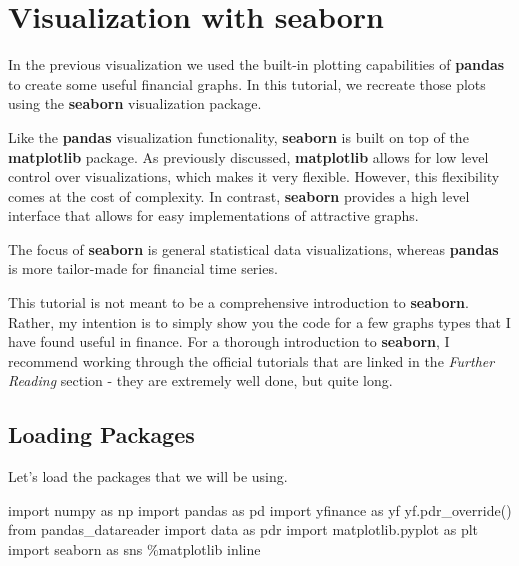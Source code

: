 \documentclass[
  letterpaper,
  DIV=11,
  numbers=noendperiod]{scrreprt}
\newenvironment{Shaded}{\begin{snugshade}}{\end{snugshade}}
\newcommand{\ImportTok}[1]{\textcolor[rgb]{0.00,0.46,0.62}{#1}}
\newcommand{\NormalTok}[1]{\textcolor[rgb]{0.00,0.23,0.31}{#1}}
\newcommand{\OperatorTok}[1]{\textcolor[rgb]{0.37,0.37,0.37}{#1}}
\begin{document}
\hypertarget{visualization-with-seaborn}{%
\chapter{\texorpdfstring{Visualization with
\textbf{seaborn}}{Visualization with seaborn}}\label{visualization-with-seaborn}}

In the previous visualization we used the built-in plotting capabilities
of \textbf{pandas} to create some useful financial graphs. In this
tutorial, we recreate those plots using the \textbf{seaborn}
visualization package.

Like the \textbf{pandas} visualization functionality, \textbf{seaborn}
is built on top of the \textbf{matplotlib} package. As previously
discussed, \textbf{matplotlib} allows for low level control over
visualizations, which makes it very flexible. However, this flexibility
comes at the cost of complexity. In contrast, \textbf{seaborn} provides
a high level interface that allows for easy implementations of
attractive graphs.

The focus of \textbf{seaborn} is general statistical data
visualizations, whereas \textbf{pandas} is more tailor-made for
financial time series.

This tutorial is not meant to be a comprehensive introduction to
\textbf{seaborn}. Rather, my intention is to simply show you the code
for a few graphs types that I have found useful in finance. For a
thorough introduction to \textbf{seaborn}, I recommend working through
the official tutorials that are linked in the \emph{Further Reading}
section - they are extremely well done, but quite long.

\hypertarget{loading-packages-5}{%
\section{Loading Packages}\label{loading-packages-5}}

Let's load the packages that we will be using.

\begin{Shaded}
\begin{Highlighting}[]
\ImportTok{import}\NormalTok{ numpy }\ImportTok{as}\NormalTok{ np}
\ImportTok{import}\NormalTok{ pandas }\ImportTok{as}\NormalTok{ pd}
\ImportTok{import}\NormalTok{ yfinance }\ImportTok{as}\NormalTok{ yf}
\NormalTok{yf.pdr\_override()}
\ImportTok{from}\NormalTok{ pandas\_datareader }\ImportTok{import}\NormalTok{ data }\ImportTok{as}\NormalTok{ pdr}
\ImportTok{import}\NormalTok{ matplotlib.pyplot }\ImportTok{as}\NormalTok{ plt}
\ImportTok{import}\NormalTok{ seaborn }\ImportTok{as}\NormalTok{ sns}
\OperatorTok{\%}\NormalTok{matplotlib inline}
\end{Highlighting}
\end{Shaded}
\end{document}
